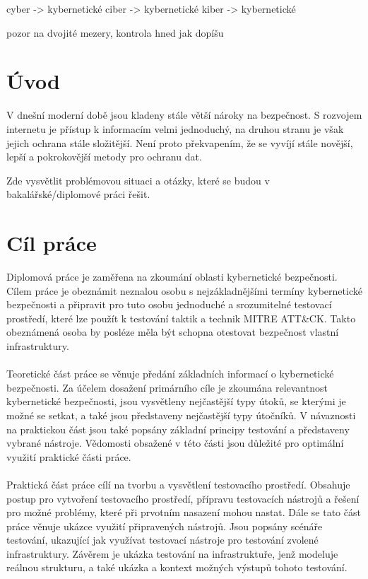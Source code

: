 
cyber -> kybernetické
ciber -> kybernetické
kiber -> kybernetické



pozor na dvojité mezery, kontrola hned jak dopíšu



\section{Úvod}\label{sec:uvod}%
V dnešní moderní době jsou kladeny stále větší nároky na
bezpečnost. S rozvojem internetu je přístup k informacím velmi
jednoduchý, na druhou stranu je však jejich ochrana stále složitější.
Není proto překvapením, že se vyvíjí stále novější, lepší a
pokrokovější metody pro ochranu dat.


Zde vysvětlit problémovou situaci a otázky, které se budou v bakalářské/diplomové práci řešit.

\section{Cíl práce}\label{sec:cil-prace}%
Diplomová práce je zaměřena na zkoumání oblasti kybernetické bezpečnosti.
Cílem práce je obeznámit neznalou osobu s nejzákladnějšími termíny kybernetické bezpečnosti a připravit pro tuto osobu jednoduché a srozumitelné testovací prostředí, které lze použít k testování taktik a technik MITRE ATT\&CK.
Takto obeznámená osoba by posléze měla být schopna otestovat bezpečnost vlastní infrastruktury.

\paragraph{}
Teoretické část práce se věnuje předání základních informací o kybernetické bezpečnosti.
Za účelem dosažení primárního cíle je zkoumána relevantnost kybernetické bezpečnosti, jsou vysvětleny nejčastější typy útoků, se kterými je možné se setkat, a také jsou představeny nejčastější typy útočníků.
V návaznosti na praktickou část jsou také popsány základní principy testování a představeny vybrané nástroje.
Vědomosti obsažené v této části jsou důležité pro optimální využití praktické části práce.

\paragraph{}
Praktická část práce cílí na tvorbu a vysvětlení testovacího prostředí.
Obsahuje postup pro vytvoření testovacího prostředí, přípravu testovacích nástrojů a řešení pro možné problémy, které při prvotním nasazení mohou nastat.
Dále se tato část práce věnuje ukázce využití připravených nástrojů.
Jsou popsány scénáře testování, ukazující jak využívat testovací nástroje pro testování zvolené infrastruktury.
Závěrem je ukázka testování na infrastruktuře, jenž modeluje reálnou strukturu, a také ukázka a kontext možných výstupů tohoto testování.



